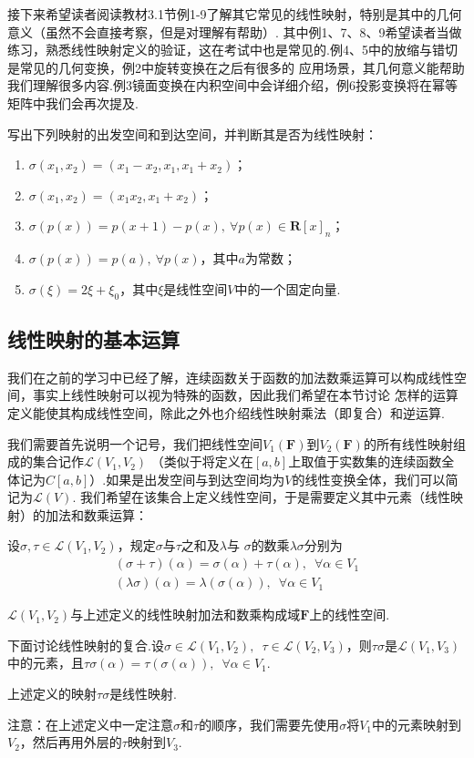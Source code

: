 接下来希望读者阅读教材3.1节例1-9了解其它常见的线性映射，特别是其中的几何意义（虽然不会直接考察，但是对理解有帮助）.
其中例1、7、8、9希望读者当做练习，熟悉线性映射定义的验证，这在考试中也是常见的.例4、5中的放缩与错切是常见的几何变换，例2中旋转变换在之后有很多的
应用场景，其几何意义能帮助我们理解很多内容.例3镜面变换在内积空间中会详细介绍，例6投影变换将在幂等矩阵中我们会再次提及.
\begin{example}
    写出下列映射的出发空间和到达空间，并判断其是否为线性映射：
    \begin{enumerate}[label=(\arabic*)]
        \item $\sigma(x_1,x_2)=(x_1-x_2,x_1,x_1+x_2)$；
        \item $\sigma(x_1,x_2)=(x_1x_2,x_1+x_2)$；
        \item $\sigma(p(x))=p(x+1)-p(x),\ \forall p(x) \in \mathbf{R}[x]_n$；
        \item $\sigma(p(x))=p(a),\ \forall p(x)$，其中$a$为常数；
        \item $\sigma(\xi)=2\xi+\xi_0$，其中$\xi$是线性空间$V$中的一个固定向量.
    \end{enumerate}
\end{example}

\subsection{线性映射的基本运算}
我们在之前的学习中已经了解，连续函数关于函数的加法数乘运算可以构成线性空间，事实上线性映射可以视为特殊的函数，因此我们希望在本节讨论
怎样的运算定义能使其构成线性空间，除此之外也介绍线性映射乘法（即复合）和逆运算.

我们需要首先说明一个记号，我们把线性空间$V_1(\mathbf{F})$到$V_2(\mathbf{F})$的所有线性映射组成的集合记作$\mathcal{L}(V_1,V_2)$
（类似于将定义在$[a,b]$上取值于实数集的连续函数全体记为$C[a,b]$）.如果是出发空间与到达空间均为$V$的线性变换全体，我们可以简记为$\mathcal{L}(V)$.
我们希望在该集合上定义线性空间，于是需要定义其中元素（线性映射）的加法和数乘运算：
\begin{definition}
    设$\sigma,\tau\in \mathcal{L}(V_1,V_2)$，规定$\sigma$与$\tau$之和及$\lambda$与
    $\sigma$的数乘$\lambda\sigma$分别为
    \begin{gather*}
        (\sigma+\tau)(\alpha)=\sigma(\alpha)+\tau(\alpha),\enspace\forall\alpha\in V_1 \\
        (\lambda\sigma)(\alpha)=\lambda(\sigma(\alpha)),\enspace\forall\alpha\in V_1
    \end{gather*}
\end{definition}
\begin{theorem}
    $\mathcal{L}(V_1,V_2)$与上述定义的线性映射加法和数乘构成域$\mathbf{F}$上的线性空间.
\end{theorem}
下面讨论线性映射的复合.设$\sigma \in \mathcal{L}(V_1,V_2),\enspace\tau \in \mathcal{L}(V_2,V_3)$，则$\tau\sigma$是$\mathcal{L}(V_1,V_3)$
中的元素，且$\tau\sigma(\alpha)=\tau(\sigma(\alpha)),\enspace\forall \alpha \in V_1$.
\begin{theorem}
    上述定义的映射$\tau\sigma$是线性映射.
\end{theorem}
注意：在上述定义中一定注意$\sigma$和$\tau$的顺序，我们需要先使用$\sigma$将$V_1$中的元素映射到
$V_2$，然后再用外层的$\tau$映射到$V_3$.

